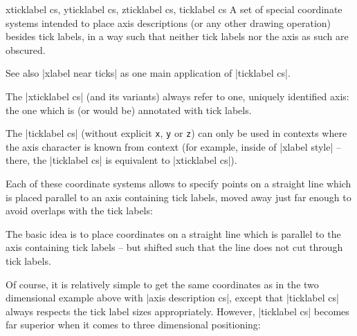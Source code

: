 \begin{coordinatesystemlist}{%
	xticklabel cs,%
	yticklabel cs,%
	zticklabel cs,
	ticklabel cs}
	A set of special coordinate systems intended to place axis descriptions (or any other drawing operation) besides tick labels, in a way such that neither tick labels nor the axis as such are obscured.

	See also |xlabel near ticks| as one main application of |ticklabel cs|.

	The |xticklabel cs| (and its variants) always refer to one, uniquely identified axis: the one which is (or would be) annotated with tick labels. 
	
	The |ticklabel cs| (without explicit \texttt{x}, \texttt{y} or \texttt{z}) can only be used in contexts where the axis character is known from context (for example, inside of |xlabel style| -- there, the |ticklabel cs| is equivalent to |xticklabel cs|).

	Each of these coordinate systems allows to specify points on a straight line which is placed parallel to an axis containing tick labels, moved away just far enough to avoid overlaps with the tick labels:
\begin{codeexample}[width=4cm]
\end{codeexample}

The basic idea is to place coordinates on a straight line which is parallel to the axis containing tick labels -- but shifted such that the line does not cut through tick labels.

Of course, it is relatively simple to get the same coordinates as in the two dimensional example above with |axis description cs|, except that |ticklabel cs| always respects the tick label sizes appropriately. However, |ticklabel cs| becomes far superior when it comes to three dimensional positioning:


\end{coordinatesystemlist}
